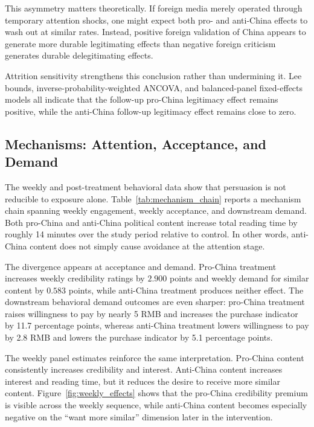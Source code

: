 \documentclass[12pt,american]{article}
\begin{document}
	
	
	This asymmetry matters theoretically. If foreign media merely operated through temporary attention shocks, one might expect both pro- and anti-China effects to wash out at similar rates. Instead, positive foreign validation of China appears to generate more durable legitimating effects than negative foreign criticism generates durable delegitimating effects.
	
	Attrition sensitivity strengthens this conclusion rather than undermining it. Lee bounds, inverse-probability-weighted ANCOVA, and balanced-panel fixed-effects models all indicate that the follow-up pro-China legitimacy effect remains positive, while the anti-China follow-up legitimacy effect remains close to zero.
	
	\subsection*{Mechanisms: Attention, Acceptance, and Demand}
	
	The weekly and post-treatment behavioral data show that persuasion is not reducible to exposure alone. Table~\ref{tab:mechanism_chain} reports a mechanism chain spanning weekly engagement, weekly acceptance, and downstream demand. Both pro-China and anti-China political content increase total reading time by roughly 14 minutes over the study period relative to control. In other words, anti-China content does not simply cause avoidance at the attention stage.
	
	The divergence appears at acceptance and demand. Pro-China treatment increases weekly credibility ratings by \(2.900\) points and weekly demand for similar content by \(0.583\) points, while anti-China treatment produces neither effect. The downstream behavioral demand outcomes are even sharper: pro-China treatment raises willingness to pay by nearly 5 RMB and increases the purchase indicator by 11.7 percentage points, whereas anti-China treatment lowers willingness to pay by 2.8 RMB and lowers the purchase indicator by 5.1 percentage points.
	
	
	
	The weekly panel estimates reinforce the same interpretation. Pro-China content consistently increases credibility and interest. Anti-China content increases interest and reading time, but it reduces the desire to receive more similar content. Figure~\ref{fig:weekly_effects} shows that the pro-China credibility premium is visible across the weekly sequence, while anti-China content becomes especially negative on the ``want more similar'' dimension later in the intervention.
	
\end{document}
